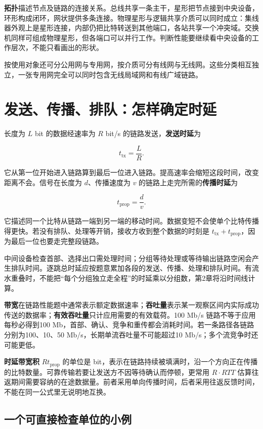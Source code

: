 \textbf{拓扑}描述节点及链路的连接关系。总线共享一条主干，星形把节点接到中央设备，环形构成闭环，网状提供多条连接。物理星形与逻辑共享介质可以同时成立：集线器外观上是星形连接，内部仍把比特转送到其他端口，各站共享一个冲突域。交换机同样可组成物理星形，但各端口可以并行工作。判断性能要继续看中央设备的工作层次，不能只看画出的形状。

按使用对象还可分公用网与专用网，按介质可分有线网与无线网。这些分类相互独立，一张专用网完全可以同时包含无线局域网和有线广域链路。

\section{发送、传播、排队：怎样确定时延}\label{cn-01-03}

长度为 \(L\) bit 的数据经速率为 \(R\) bit/s 的链路发送，\textbf{发送时延}为

\[t_{\mathrm{tx}}=\frac{L}{R}.\]

它从第一位开始进入链路算到最后一位进入链路。提高速率会缩短这段时间，改变距离不会。信号在长度为 \(d\)、传播速度为 \(v\) 的链路上走完所需的\textbf{传播时延}为

\[t_{\mathrm{prop}}=\frac{d}{v}.\]

它描述同一个比特从链路一端到另一端的移动时间。数据变短不会使单个比特传播得更快。若没有排队、处理等开销，接收方收到整个数据的时刻是 \(t_{\mathrm{tx}}+t_{\mathrm{prop}}\)，因为最后一位也要走完整段链路。

中间设备检查首部、选择出口需处理时间；分组等待处理或等待输出链路空闲会产生排队时间。逐跳总时延应按题意累加各段的发送、传播、处理和排队时间。有流水重叠时，不能把``每个分组独立走全程''的时延乘以分组数，第2章将沿时间线计算。

\textbf{带宽}在链路性能题中通常表示额定数据速率；\textbf{吞吐量}表示某一观察区间内实际成功传送的数据率；\textbf{有效吞吐量}只计应用需要的有效载荷。100 Mb/s 链路不等于应用每秒必得到100 Mb，首部、确认、竞争和重传都会消耗时间。若一条路径各链路分别为100、10、50 Mb/s，长期单流吞吐量不可能超过10 Mb/s；多个流竞争时还可能更低。

\textbf{时延带宽积} \(R t_{\mathrm{prop}}\) 的单位是 bit，表示在链路持续被填满时，沿一个方向正在传播的比特数量。可靠传输若要让发送方不因等待确认而停顿，更常用 \(R\cdot RTT\) 估算往返期间需要容纳的在途数据量。前者采用单向传播时间，后者采用往返反馈时间，不能在同一公式里无说明地互换。

\subsection{一个可直接检查单位的小例}\label{cn-c01-h45}

